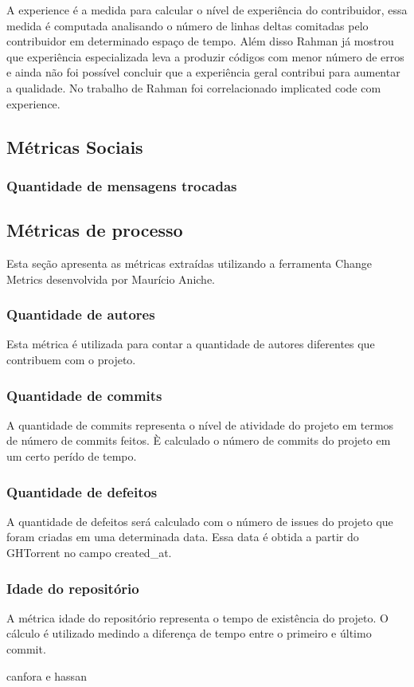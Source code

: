 A experience é a medida para calcular o nível de experiência do contribuidor, essa medida é computada analisando o número de linhas\cite{Rahman2011} deltas comitadas pelo contribuidor em determinado espaço de tempo. Além disso Rahman já mostrou que experiência especializada leva a produzir códigos com menor número de erros e ainda não foi possível concluir que a experiência geral contribui para aumentar a qualidade. No trabalho de Rahman foi correlacionado implicated code com experience.

\subsection{Métricas Sociais}
\subsubsection{Quantidade de mensagens trocadas}

\subsection{Métricas de processo}
Esta seção apresenta as métricas extraídas utilizando a ferramenta Change Metrics desenvolvida por Maurício Aniche.
\subsubsection{Quantidade de autores}
Esta métrica é utilizada para contar a quantidade de autores diferentes que contribuem com o projeto.
\subsubsection{Quantidade de commits}
A quantidade de commits representa o nível de atividade do projeto em termos de número de commits feitos. È calculado o número de commits do projeto em um certo perído de tempo. 
\subsubsection{Quantidade de defeitos}
A quantidade de defeitos será calculado com o número de issues do projeto que foram criadas em uma determinada data. Essa data é obtida a partir do GHTorrent no campo created\_at.
\subsubsection{Idade do repositório}
A métrica idade do repositório representa o tempo de existência do projeto. O cálculo é utilizado medindo a diferença de tempo entre o primeiro e último commit.

canfora e hassan